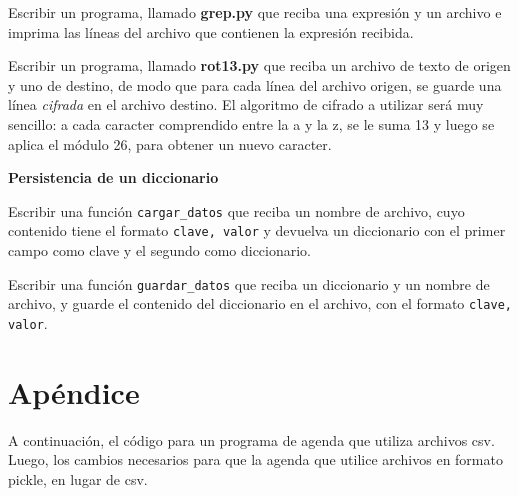 \begin{ejercicio}
Escribir un programa, llamado {\bf grep.py} que reciba una expresión y un
archivo e imprima las líneas del archivo que contienen la expresión recibida.
\end{ejercicio}

\begin{ejercicio}
Escribir un programa, llamado {\bf rot13.py} que reciba un archivo de texto de
origen y uno de destino, de modo que para cada línea del archivo origen, se
guarde una línea {\it cifrada} en el archivo destino.  El algoritmo de cifrado
a utilizar será muy sencillo: a cada caracter comprendido entre la a y la z, se
le suma 13 y luego se aplica el módulo 26, para obtener un nuevo caracter.
\end{ejercicio}

\begin{ejercicio} {\bf Persistencia de un diccionario}
\begin{partes}
  \item Escribir una función \lstinline!cargar_datos! que reciba un nombre de
archivo, cuyo contenido tiene el formato \lstinline!clave, valor! y devuelva un
diccionario con el primer campo como clave y el segundo como diccionario.
  \item Escribir una función \lstinline!guardar_datos! que reciba un diccionario
y un nombre de archivo, y guarde el contenido del diccionario en el archivo,
con el formato \lstinline!clave, valor!.
\end{partes}
\end{ejercicio}

\newpage
\section{Apéndice}

A continuación, el código para un programa de agenda que utiliza archivos
csv. Luego, los cambios necesarios para que la agenda que utilice archivos
en formato pickle, en lugar de csv.





